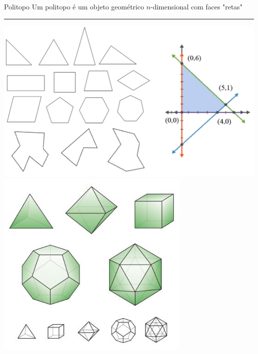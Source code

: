 \documentclass[compress,mathserif]{beamer}
\begin{document}
\begin{frame}{Politopo}
    Um politopo é um objeto geométrico $n$-dimensional com faces "retas"

    \begin{overprint}
     \vspace{3.5cm} 
     \vspace{3.5cm} \par\noindent\rule{\textwidth}{1pt}
     \vspace{0.4cm}\centering\includegraphics[width=\textwidth]{images/poligonos.png}
    \centering\includegraphics[width=0.70\textwidth]{images/poliedro.jpg}
    \end{overprint}
    
\end{frame}

\end{document}
